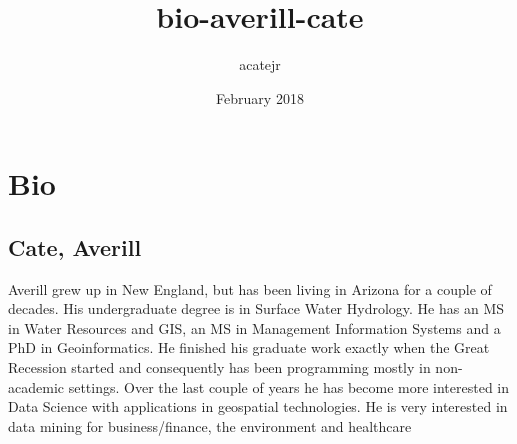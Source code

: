 \documentclass{article}
\title{bio-averill-cate}
\author{acatejr }
\date{February 2018}
\begin{document}
\maketitle

\section{Bio}

\subsection{Cate, Averill}
Averill grew up in New England, but has been living in Arizona for a couple of decades.  His undergraduate degree is in Surface Water Hydrology.  He has an MS in Water Resources and GIS, an MS in Management Information Systems and a  PhD in Geoinformatics.  He finished his graduate work exactly when the Great Recession started and consequently has been programming mostly in non-academic settings.  Over the last couple of years he has become more interested in Data Science with applications in geospatial technologies.   He is very interested in data mining for business/finance, the environment and healthcare
\end{document}
